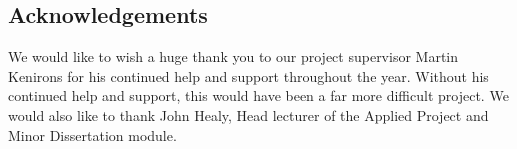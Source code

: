\subsection{Acknowledgements}
We would like to wish a huge thank you to our project supervisor Martin Kenirons for his continued help and support throughout the year. Without his continued help and support, this would have been a far more difficult project. We would also like to thank John Healy, Head lecturer of the Applied Project and Minor Dissertation module.


